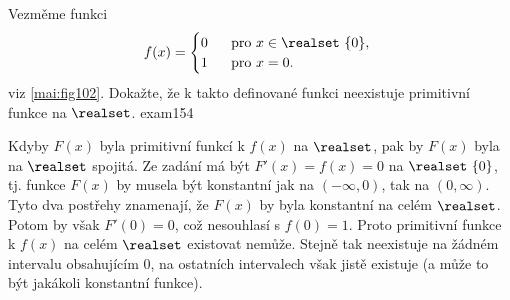 \begin{mathexam}{Vezměme funkci 
  \begin{equation*}
    f(x) = 
    \begin{cases}
       0 & \text{pro} x\in\realset\ \{0\}, \\
       1 & \text{pro} x=0.
   \end{cases}
  \end{equation*}
  viz \ref{mai:fig102}. Dokažte, že k takto definované funkci neexistuje primitivní funkce na
  \(\realset\).
  }{exam154} 

  {\centering
    \captionsetup{type=figure} 
    \label{mai:fig102}
  \par}
  
  Kdyby \(F(x)\) byla primitivní funkcí k \(f(x)\) na \(\realset\), pak by \(F(x)\) byla na
  \(\realset\) spojitá. Ze zadání má být \(F'(x) = f(x) = 0\) na \(\realset\ \{0\}\), tj. funkce
  \(F(x)\) by musela být konstantní jak na \((−\infty, 0)\), tak na \((0, ∞)\). Tyto dva postřehy
  znamenají, že \(F(x)\) by byla konstantní na celém \(\realset\). Potom by však \(F'(0) = 0\), což
  nesouhlasí s \(f(0) = 1\). Proto primitivní funkce k \(f(x)\) na celém \(\realset\) existovat
  nemůže. Stejně tak neexistuje na žádném intervalu obsahujícím \(0\), na ostatních intervalech však
  jistě existuje (a může to být jakákoli konstantní funkce).
\end{mathexam}